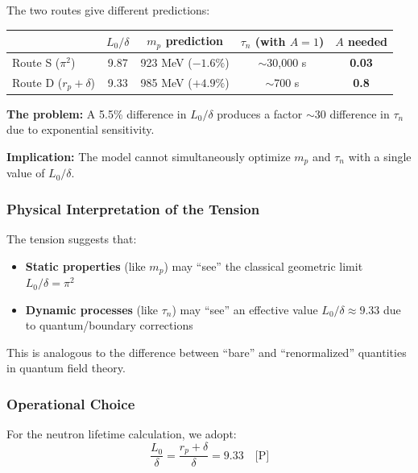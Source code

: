 \documentclass[11pt,a4paper]{article}
\begin{document}
\begin{tcolorbox}[colback=red!5!white, colframe=red!50!black, title=\textbf{Internal Tension}]
The two routes give different predictions:

\begin{center}
\begin{tabular}{lcccc}
\toprule
& $L_0/\delta$ & $m_p$ prediction & $\tau_n$ (with $A=1$) & $A$ needed \\
\midrule
Route S ($\pi^2$) & 9.87 & 923 MeV ($-1.6\%$) & $\sim$30,000 s & \textbf{0.03} \\
Route D ($r_p+\delta$) & 9.33 & 985 MeV ($+4.9\%$) & $\sim$700 s & \textbf{0.8} \\
\bottomrule
\end{tabular}
\end{center}

\textbf{The problem:} A 5.5\% difference in $L_0/\delta$ produces a factor $\sim$30 difference in $\tau_n$ due to exponential sensitivity.

\textbf{Implication:} The model cannot simultaneously optimize $m_p$ and $\tau_n$ with a single value of $L_0/\delta$.
\end{tcolorbox}

\subsubsection{Physical Interpretation of the Tension}

The tension suggests that:
\begin{itemize}
\item \textbf{Static properties} (like $m_p$) may ``see'' the classical geometric limit $L_0/\delta = \pi^2$
\item \textbf{Dynamic processes} (like $\tau_n$) may ``see'' an effective value $L_0/\delta \approx 9.33$ due to quantum/boundary corrections
\end{itemize}

This is analogous to the difference between ``bare'' and ``renormalized'' quantities in quantum field theory.

\subsubsection{Operational Choice}

For the neutron lifetime calculation, we adopt:
\begin{equation}
\frac{L_0}{\delta} = \frac{r_p + \delta}{\delta} = 9.33 \quad \text{[P]}
\end{equation}
\end{document}
